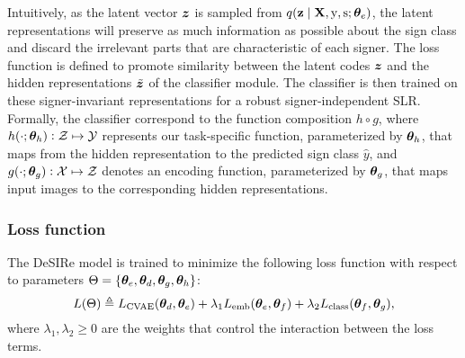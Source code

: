 Intuitively, as the latent vector ${\bm{z}}$ is sampled from $q({\mathbf{z}} \mid {\mathbf{X}}, {\textnormal{y}}, {\textnormal{s}}; {\bm{\theta}}_e)$, the latent representations will preserve as much information as possible about the sign class and discard the irrelevant parts that are characteristic of each signer. The loss function is defined to promote similarity between the latent codes ${\bm{z}}$ and the hidden representations $\tilde{{\bm{z}}}$ of the classifier module. The classifier is then trained on these signer-invariant representations for a robust signer-independent SLR. Formally, the classifier correspond to the function composition $h \circ g$, where $h(\cdot; {\bm{\theta}}_h): {\mathcal{Z}} \mapsto {\mathcal{Y}}$ represents our task-specific function, parameterized by ${\bm{\theta}}_h$, that maps from the hidden representation to the predicted sign class $\hat{y}$, and $g(\cdot; {\bm{\theta}}_g): {\mathcal{X}} \mapsto {\mathcal{Z}}$ denotes an encoding function, parameterized by ${\bm{\theta}}_g$, that maps input images to the corresponding hidden representations.

\subsubsection{Loss function}
\label{sec:desire_loss}
The DeSIRe model is trained to minimize the following loss function with respect to parameters $\Theta=\{{\bm{\theta}}_{e},{\bm{\theta}}_{d},{\bm{\theta}}_{g},{\bm{\theta}}_{h}\}$:
\begin{equation}
    L(\Theta) \triangleq L_{\text{CVAE}}({\bm{\theta}}_{d},{\bm{\theta}}_{e}) + \lambda_{1} L_{\text{emb}}({\bm{\theta}}_{e},{\bm{\theta}}_{f}) + \lambda_{2} L_{\text{class}}({\bm{\theta}}_{f},{\bm{\theta}}_{g}),
\end{equation}
where $\lambda_{1},\lambda_{2}\geq 0$ are the weights that control the interaction between the loss terms.

